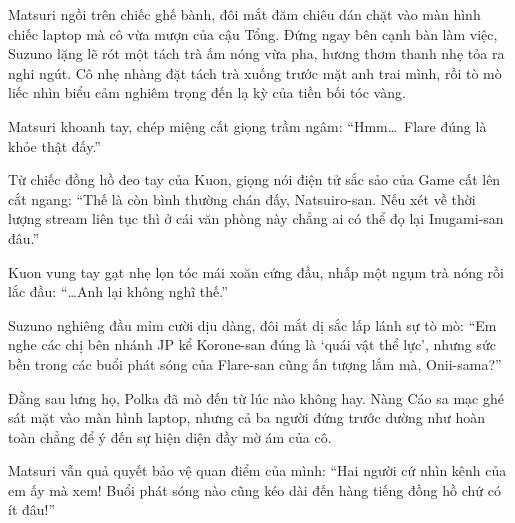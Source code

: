 \documentclass[../main.tex]{subfiles}
\begin{document}
\color{black}


Matsuri ngồi trên chiếc ghế bành, đôi mắt đăm chiêu dán chặt vào màn hình chiếc laptop mà cô vừa mượn của cậu Tổng. Đứng ngay bên cạnh bàn làm việc, Suzuno lặng lẽ rót một tách trà ấm nóng vừa pha, hương thơm thanh nhẹ tỏa ra nghi ngút. Cô nhẹ nhàng đặt tách trà xuống trước mặt anh trai mình, rồi tò mò liếc nhìn biểu cảm nghiêm trọng đến lạ kỳ của tiền bối tóc vàng.


Matsuri khoanh tay, chép miệng cất giọng trầm ngâm: ``Hmm\dots\ Flare đúng là khỏe thật đấy.''

Từ chiếc đồng hồ đeo tay của Kuon, giọng nói điện tử sắc sảo của Game cất lên cắt ngang: ``Thế là còn bình thường chán đấy, Natsuiro-san. Nếu xét về thời lượng stream liên tục thì ở cái văn phòng này chẳng ai có thể đọ lại Inugami-san đâu.''

Kuon vung tay gạt nhẹ lọn tóc mái xoăn cứng đầu, nhấp một ngụm trà nóng rồi lắc đầu: ``\dots Anh lại không nghĩ thế.''

Suzuno nghiêng đầu mỉm cười dịu dàng, đôi mắt dị sắc lấp lánh sự tò mò: ``Em nghe các chị bên nhánh JP kể Korone-san đúng là `quái vật thể lực', nhưng sức bền trong các buổi phát sóng của Flare-san cũng ấn tượng lắm mà, Onii-sama?''

Đằng sau lưng họ, Polka đã mò đến từ lúc nào không hay. Nàng Cáo sa mạc ghé sát mặt vào màn hình laptop, nhưng cả ba người đứng trước dường như hoàn toàn chẳng để ý đến sự hiện diện đầy mờ ám của cô.

Matsuri vẫn quả quyết bảo vệ quan điểm của mình: ``Hai người cứ nhìn kênh của em ấy mà xem! Buổi phát sóng nào cũng kéo dài đến hàng tiếng đồng hồ chứ có ít đâu!''
\end{document}
